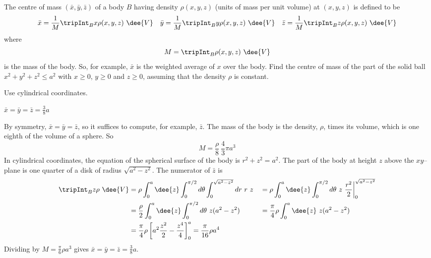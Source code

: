 \begin{question}
The centre of mass $(\bar x,\bar y, \bar z)$ of a body $B$ having
density $\rho(x,y,z)$ (units of mass per unit volume) at $(x,y,z)$ is defined
to be
\begin{equation*}
\bar x=\frac{1}{M}\tripInt_B x\rho(x,y,z)\ \dee{V}\quad
\bar y=\frac{1}{M}\tripInt_B y\rho(x,y,z)\ \dee{V}\quad
\bar z=\frac{1}{M}\tripInt_B z\rho(x,y,z)\ \dee{V}
\end{equation*}
where
\begin{equation*}
M=\tripInt_B \rho(x,y,z)\ \dee{V}
\end{equation*}
is the mass of the body. So, for example, $\bar x$ is the weighted average
of $x$ over the body. Find the centre of mass of the part of the solid
ball $x^2+y^2+z^2\le a^2$ with $x\ge 0$, $y\ge 0$ and $z\ge 0$, assuming
that the density $\rho$ is constant.
\end{question}

\begin{hint}
Use cylindrical coordinates.
\end{hint}

\begin{answer}
$\bar x=\bar y=\bar z=\frac{3}{8}a$
\end{answer}

\begin{solution}
By symmetry, $\bar x=\bar y=\bar z$, so it suffices to compute,
for example, $\bar z$.   The mass of the body is the density, $\rho$,
times its volume, which is one eighth of the volume of a sphere. So
\begin{equation*}
M=\frac{\rho}{8}\ \frac{4}{3}\pi a^3
\end{equation*}
In cylindrical coordinates, the equation of the spherical surface of the
body is $r^2+z^2=a^2$. The part of the body at height $z$ above the 
$xy$--plane is one quarter of a disk of radius $\sqrt{a^2-z^2}$. The numerator
of $\bar z$ is
\begin{alignat*}{3}
\tripInt_B z\rho\ \dee{V}
&=\rho\int_0^a \dee{z}\int_0^{\pi/2}d\theta\int_0^{\sqrt{a^2-z^2}}dr\ r\ z
&&=\rho\int_0^a \dee{z}\int_0^{\pi/2}d\theta\ z\ \frac{r^2}{2}
                                   \bigg|_0^{\sqrt{a^2-z^2}} \\
&=\frac{\rho}{2}\int_0^a \dee{z}\int_0^{\pi/2}d\theta\ z(a^2-z^2)
&&=\frac{\pi}{4}\rho\int_0^a \dee{z}\ z(a^2-z^2) \\
&=\frac{\pi}{4}\rho\left[a^2\frac{z^2}{2}-\frac{z^4}{4}\right]_0^a 
=\frac{\pi}{16}\rho a^4
\end{alignat*}
Dividing by $M=\frac{\pi}{6}\rho a^3$ gives 
$\bar x=\bar y=\bar z=\frac{3}{8}a$.
\end{solution}

